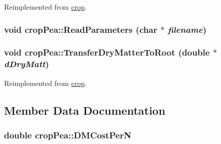 Reimplemented from \hyperlink{classcrop_a4ed6aaf98890015fb52d4d8957313166}{crop}.\hypertarget{classcrop_pea_a95c81e1e9ce7479013fac70b8e4cee86}{
\subsubsection[{ReadParameters}]{\setlength{\rightskip}{0pt plus 5cm}void cropPea::ReadParameters (char $\ast$ {\em filename})}}
\label{classcrop_pea_a95c81e1e9ce7479013fac70b8e4cee86}
\hypertarget{classcrop_pea_acd369e049225726674bcc0091f2f9e54}{
\subsubsection[{TransferDryMatterToRoot}]{\setlength{\rightskip}{0pt plus 5cm}void cropPea::TransferDryMatterToRoot (double $\ast$ {\em dDryMatt})}}
\label{classcrop_pea_acd369e049225726674bcc0091f2f9e54}


Reimplemented from \hyperlink{classcrop_aeb0993f2a6d2f21d30a5c24bbd46833e}{crop}.

\subsection{Member Data Documentation}
\hypertarget{classcrop_pea_a74e2cc41cbccf0a208430b23a1267853}{
\subsubsection[{DMCostPerN}]{\setlength{\rightskip}{0pt plus 5cm}double {\bf cropPea::DMCostPerN}}}
\label{classcrop_pea_a74e2cc41cbccf0a208430b23a1267853}


